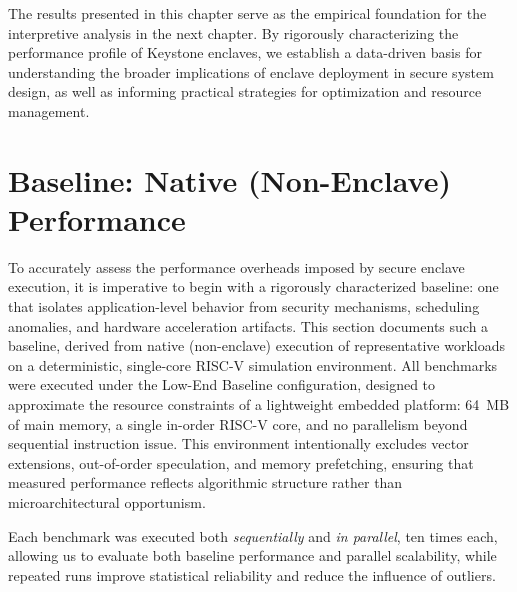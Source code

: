 The results presented in this chapter serve as the empirical foundation for the interpretive analysis in the next chapter. By rigorously characterizing the performance profile of Keystone enclaves, we establish a data-driven basis for understanding the broader implications of enclave deployment in secure system design, as well as informing practical strategies for optimization and resource management.

\section{Baseline: Native (Non-Enclave) Performance}
\label{sec:baseline-native}

To accurately assess the performance overheads imposed by secure enclave execution, it is imperative to begin with a rigorously characterized baseline: one that isolates application-level behavior from security mechanisms, scheduling anomalies, and hardware acceleration artifacts. This section documents such a baseline, derived from native (non-enclave) execution of representative workloads on a deterministic, single-core RISC-V simulation environment. All benchmarks were executed under the Low-End Baseline configuration, designed to approximate the resource constraints of a lightweight embedded platform: 64~MB of main memory, a single in-order RISC-V core, and no parallelism beyond sequential instruction issue. This environment intentionally excludes vector extensions, out-of-order speculation, and memory prefetching, ensuring that measured performance reflects algorithmic structure rather than microarchitectural opportunism.

Each benchmark was executed both \emph{sequentially} and \emph{in parallel}, ten times each, allowing us to evaluate both baseline performance and parallel scalability, while repeated runs improve statistical reliability and reduce the influence of outliers.

